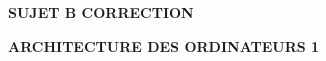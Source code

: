 \documentclass[11pt,a4paper]{article}
\newcommand{\TitreMatiere}{Architecture des Ordinateurs 1}
\begin{document}

%
%

\clearpage



\vfillFirst

\begin{center}

\begin{LARGE}
\textbf{SUJET B CORRECTION}

\bigskip

\textbf{\MakeUppercase{\TitreMatiere}}
\end{LARGE}

\end{center}

\vfillLast
\end{document}
